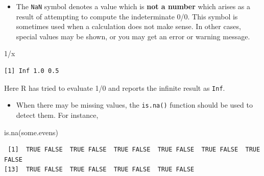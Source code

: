 \documentclass[
  9pt,
  a4paper,
  ignorenonframetext,
  notheorems]{beamer}
\newenvironment{Shaded}{\begin{snugshade}}{\end{snugshade}}
\newcommand{\DecValTok}[1]{\textcolor[rgb]{0.68,0.00,0.00}{#1}}
\newcommand{\FunctionTok}[1]{\textcolor[rgb]{0.28,0.35,0.67}{#1}}
\newcommand{\NormalTok}[1]{\textcolor[rgb]{0.00,0.23,0.31}{#1}}
\newcommand{\SpecialCharTok}[1]{\textcolor[rgb]{0.37,0.37,0.37}{#1}}
\providecommand{\tightlist}{%
  \setlength{\itemsep}{0pt}\setlength{\parskip}{0pt}}\usepackage{longtable,booktabs,array}
\begin{document}
\begin{frame}[fragile]
\begin{itemize}
\tightlist
\item
  The \texttt{NaN} symbol denotes a value which is \textbf{not a number}
  which arises as a result of attempting to compute the indeterminate
  0/0. This symbol is sometimes used when a calculation does not make
  sense. In other cases, special values may be shown, or you may get an
  error or warning message.
\end{itemize}

\begin{Shaded}
\begin{Highlighting}[]
\DecValTok{1}\SpecialCharTok{/}\NormalTok{x}
\end{Highlighting}
\end{Shaded}

\begin{verbatim}
[1] Inf 1.0 0.5
\end{verbatim}

Here R has tried to evaluate 1/0 and reports the infinite result as
\texttt{Inf}.

\begin{itemize}
\tightlist
\item
  When there may be missing values, the \texttt{is.na()} function should
  be used to detect them. For instance,
\end{itemize}

\begin{Shaded}
\begin{Highlighting}[]
\FunctionTok{is.na}\NormalTok{(some.evens)}
\end{Highlighting}
\end{Shaded}

\begin{verbatim}
 [1]  TRUE FALSE  TRUE FALSE  TRUE FALSE  TRUE FALSE  TRUE FALSE  TRUE FALSE
[13]  TRUE FALSE  TRUE FALSE  TRUE FALSE  TRUE FALSE
\end{verbatim}
\end{frame}
\end{document}
